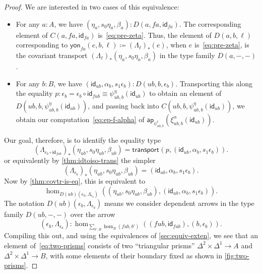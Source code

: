 \documentclass{amsart}
\theoremstyle{plain}
\theoremstyle{definition}
\theoremstyle{remark}
\numberwithin{equation}{section}
\newcommand{\jdeq}{\equiv}
\newcommand{\defeq}{\coloneqq}
\newcommand{\yon}{\mathsf{yon}}
\newcommand{\connmin}[1]{\mathsf{\Lambda}_{#1}}
\newcommand{\idarr}[1]{\mathsf{id}_{#1}}
\newcommand{\transport}[3]{\mathsf{transport}^{#1}(#2,#3)}%
\newcommand{\ap}{\mathsf{ap}}                             %
\newcommand{\covtr}[1]{{#1}_*}  %
\begin{document}
\begin{proof}
  We are interested in two cases of this equivalence:
  \begin{itemize}
  \item For any $a:A$, we have $(\eta_a,s_0\eta_a,\beta_a):D(a,fa,\idarr{fa})$.
    The corresponding element of $C(a,fa,\idarr{fa})$ is~\eqref{eq:pre-zeta}.
    Thus, the element of $D(a,b,\ell)$ corresponding to $\yon_{fa}(e,b,\ell) \defeq \covtr{(\connmin \ell)}(e)$, when $e$ is~\eqref{eq:pre-zeta}, is the covariant transport $\covtr{(\connmin \ell)}(\eta_a,s_0\eta_a,\beta_a)$ in the type family $D(a,-,-)$.
  \item For any $b:B$, we have $(\idarr{ub},\alpha_b,s_1 \epsilon_b):D(ub,b,\epsilon_b)$.
    Transporting this along the equality $p : \epsilon_b = \epsilon_b \circ \idarr{fub} \jdeq \psi^\eta_{ub,b} (\idarr{ub})$ to obtain an element of $D(ub,b,\psi^\eta_{ub,b} (\idarr{ub}))$, and passing back into $C(ub,b,\psi^\eta_{ub,b} (\idarr{ub}))$, we obtain our computation~\eqref{eq:ep-f-alpha} of $\ap_{\psi^\epsilon_{ub,b}}(\xi^\alpha_{ub,b}(\idarr{ub}))$.
  \end{itemize}
  Our goal, therefore, is to identify the equality type 
  \[\covtr{(\connmin {\epsilon_b\circ \idarr{fub}})}(\eta_{ub},s_0\eta_{ub},\beta_{ub})
  = \transport{}{p}{(\idarr{ub},\alpha_b,s_1 \epsilon_b)}.
  \]
  or equivalently by \cref{thm:idtoiso-trans} the simpler
  \[\covtr{(\connmin {\epsilon_b})}(\eta_{ub},s_0\eta_{ub},\beta_{ub})
  = (\idarr{ub},\alpha_b,s_1 \epsilon_b).
  \]
  Now by \cref{thm:covtr-is-eq}, this is equivalent to
  \begin{equation}
    \hom_{D(ub)(\epsilon_b,\connmin{\epsilon_b})}((\eta_{ub},s_0\eta_{ub},\beta_{ub}), (\idarr{ub},\alpha_b,s_1 \epsilon_b)).\label{eq:two-prisms}
  \end{equation}
  The notation $D(ub)(\epsilon_b,\connmin{\epsilon_b})$ means we consider dependent arrows in the type family $D(ub,-,-)$ over the arrow
  \[ (\epsilon_b,\connmin{\epsilon_b}):\hom_{\sum_{b':B} \hom_B(fub,b')}((fub,\idarr{fub}),(b,\epsilon_b)).\]
  Compiling this out, and using the equivalences of \cref{sec:equiv-exten}, we see that an element of~\eqref{eq:two-prisms} consists of two ``triangular prisms'' $\Delta^2\times\Delta^1 \to A$ and $\Delta^2\times\Delta^1 \to B$, with some elements of their boundary fixed as shown in \cref{fig:two-prisms}.



\end{proof}
\end{document}
